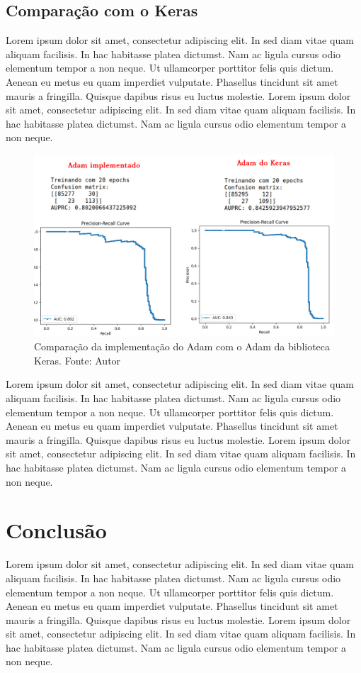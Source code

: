 \documentclass[11pt]{article}
\begin{document}
\subsection*{Comparação com o Keras}
Lorem ipsum dolor sit amet, consectetur adipiscing elit. In sed diam vitae quam aliquam facilisis. In hac habitasse platea dictumst. Nam ac ligula cursus odio elementum tempor a non neque. Ut ullamcorper porttitor felis quis dictum. Aenean eu metus eu quam imperdiet vulputate. Phasellus tincidunt sit amet mauris a fringilla. Quisque dapibus risus eu luctus molestie. Lorem ipsum dolor sit amet, consectetur adipiscing elit. In sed diam vitae quam aliquam facilisis. In hac habitasse platea dictumst. Nam ac ligula cursus odio elementum tempor a non neque. 

\begin{figure}[H]
\center
\includegraphics[scale=0.5]{Figuras/ADAM_VS_KERAS.png}
\caption{Comparação da implementação do Adam com o Adam da biblioteca Keras. Fonte: Autor} 
\label{CONFM}
\end{figure}


Lorem ipsum dolor sit amet, consectetur adipiscing elit. In sed diam vitae quam aliquam facilisis. In hac habitasse platea dictumst. Nam ac ligula cursus odio elementum tempor a non neque. Ut ullamcorper porttitor felis quis dictum. Aenean eu metus eu quam imperdiet vulputate. Phasellus tincidunt sit amet mauris a fringilla. Quisque dapibus risus eu luctus molestie. Lorem ipsum dolor sit amet, consectetur adipiscing elit. In sed diam vitae quam aliquam facilisis. In hac habitasse platea dictumst. Nam ac ligula cursus odio elementum tempor a non neque. 
\section{Conclusão}
Lorem ipsum dolor sit amet, consectetur adipiscing elit. In sed diam vitae quam aliquam facilisis. In hac habitasse platea dictumst. Nam ac ligula cursus odio elementum tempor a non neque. Ut ullamcorper porttitor felis quis dictum. Aenean eu metus eu quam imperdiet vulputate. Phasellus tincidunt sit amet mauris a fringilla. Quisque dapibus risus eu luctus molestie. Lorem ipsum dolor sit amet, consectetur adipiscing elit. In sed diam vitae quam aliquam facilisis. In hac habitasse platea dictumst. Nam ac ligula cursus odio elementum tempor a non neque. 
\end{document}
